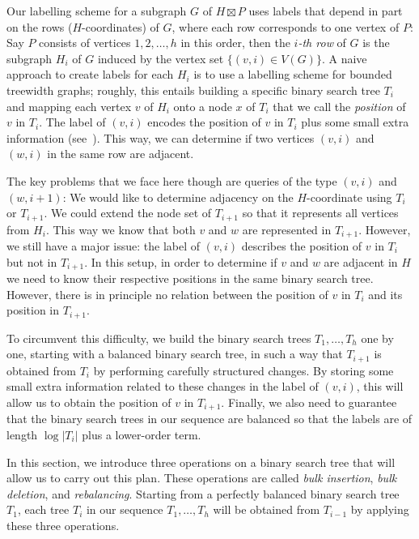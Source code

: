 \documentclass[10pt, conference, compsocconf]{IEEEtran}
\begin{document}
Our labelling scheme for a subgraph $G$ of $H \boxtimes P$ uses labels that depend in part on the rows ($H$-coordinates) of $G$, where each row corresponds to one vertex of $P$: Say $P$ consists of vertices $1, 2, \dots, h$ in this order, then the \emph{$i$-th row} of $G$ is the subgraph $H_i$ of $G$ induced by the vertex set $\{(v, i) \in V(G)\}$.
A naive approach to create labels for each $H_i$ is to use a labelling scheme for bounded treewidth graphs; roughly, this entails building a specific binary search tree $T_i$ and mapping each vertex $v$ of $H_i$ onto a node $x$ of $T_i$ that we call the \emph{position} of $v$ in $T_i$.
The label of $(v, i)$ encodes the position of $v$ in $T_i$ plus some small extra information (see~).
This way, we can determine if two vertices $(v,i)$ and $(w,i)$ in the same row are adjacent.

The key problems that we face here though are queries of the type $(v,i)$ and $(w,i+1)$: We would like to determine adjacency on the $H$-coordinate using $T_i$ or $T_{i+1}$.
We could extend the node set of $T_{i+1}$ so that it represents all vertices from $H_{i}$. This way we know that both $v$ and $w$ are represented in $T_{i+1}$.
However, we still have a major issue: the label of $(v,i)$ describes the position of $v$ in $T_i$ but not in $T_{i+1}$.
In this setup, in order to determine if $v$ and $w$ are adjacent in $H$ we need to know their respective positions in the same binary search tree.
However, there is in principle no relation between the position of $v$ in $T_i$ and its position in $T_{i+1}$.

To circumvent this difficulty, we build the binary search trees $T_1,\dots,T_h$ one by one, starting with a balanced binary search tree, in such a way that $T_{i+1}$ is obtained from $T_i$ by performing carefully structured changes. By storing some small extra information related to these changes in the label of $(v,i)$, this will allow us to obtain the position of $v$ in $T_{i+1}$.
Finally, we also need to guarantee that the binary search trees in our sequence are balanced so that the labels are of length $\log|T_i|$ plus a lower-order term.

In this section, we introduce three operations on a binary search tree that will allow us to carry out this plan.
These operations are called \emph{bulk insertion}, \emph{bulk deletion}, and \emph{rebalancing}.
Starting from a perfectly balanced binary search tree $T_1$, each tree $T_i$ in our sequence $T_1, \dots, T_h$ will be obtained from $T_{i-1}$ by applying these three operations.
\end{document}
